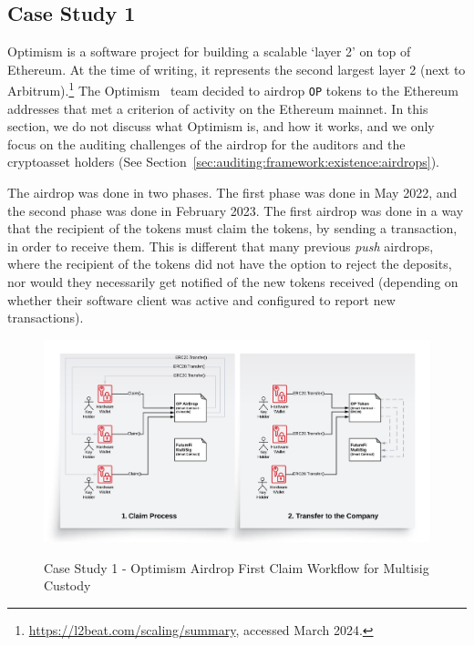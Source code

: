 \subsection{Case Study 1} \label{sec:auditing:case-studies:existence} %

Optimism is a software project for building a scalable `layer 2' on top of Ethereum. At the time of writing, it represents the second largest layer 2 (next to Arbitrum).\footnote{\url{https://l2beat.com/scaling/summary}, accessed March 2024.} The Optimism~\cite{optimismgithub} team decided to airdrop \texttt{OP} tokens to the Ethereum addresses that met a criterion of activity on the Ethereum mainnet. In this section, we do not discuss what Optimism is, and how it works, and we only focus on the auditing challenges of the airdrop for the auditors and the cryptoasset holders (See Section~\ref{sec:auditing:framework:existence:airdrops}). 

The airdrop was done in two phases. The first phase was done in May 2022, and the second phase was done in February 2023. The first airdrop was done in a way that the recipient of the tokens must claim the tokens, by sending a transaction, in order to receive them. This is different that many previous \textit{push} airdrops, where the recipient of the tokens did not have the option to reject the deposits, nor would they necessarily get notified of the new tokens received (depending on whether their software client was active and configured to report new transactions). 


\begin{figure}[t]
    \centering
{\includegraphics[width=1\textwidth]{figures/BlockchainAudit-OPAirdrop.png}}
{\caption[Case Study 1 - Optimism Airdrop First Claim Workflow]{Case Study 1 - Optimism Airdrop First Claim Workflow for Multisig Custody}\label{fig:opairdrop}}
\end{figure}
%

